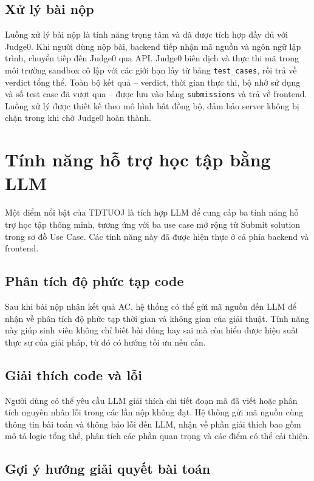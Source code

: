 \documentclass[12pt, a4paper]{report}
\begin{document}
\subsection{Xử lý bài nộp}

Luồng xử lý bài nộp là tính năng trọng tâm và đã được tích hợp đầy đủ với Judge0. Khi người dùng nộp bài, backend tiếp nhận mã nguồn và ngôn ngữ lập trình, chuyển tiếp đến Judge0 qua \ac{API}. Judge0 biên dịch và thực thi mã trong môi trường sandbox cô lập với các giới hạn lấy từ bảng \texttt{test\_cases}, rồi trả về verdict tổng thể. Toàn bộ kết quả -- verdict, thời gian thực thi, bộ nhớ sử dụng và số test case đã vượt qua -- được lưu vào bảng \texttt{submissions} và trả về frontend. Luồng xử lý được thiết kế theo mô hình bất đồng bộ, đảm bảo server không bị chặn trong khi chờ Judge0 hoàn thành.

\section{Tính năng hỗ trợ học tập bằng LLM}

Một điểm nổi bật của TDTUOJ là tích hợp \ac{LLM} để cung cấp ba tính năng hỗ trợ học tập thông minh, tương ứng với ba use case mở rộng từ Submit solution trong sơ đồ Use Case. Các tính năng này đã được hiện thực ở cả phía backend và frontend.

\subsection{Phân tích độ phức tạp code}

Sau khi bài nộp nhận kết quả \ac{AC}, hệ thống có thể gửi mã nguồn đến \ac{LLM} để nhận về phân tích độ phức tạp thời gian và không gian của giải thuật. Tính năng này giúp sinh viên không chỉ biết bài đúng hay sai mà còn hiểu được hiệu suất thực sự của giải pháp, từ đó có hướng tối ưu nếu cần.

\subsection{Giải thích code và lỗi}

Người dùng có thể yêu cầu \ac{LLM} giải thích chi tiết đoạn mã đã viết hoặc phân tích nguyên nhân lỗi trong các lần nộp không đạt. Hệ thống gửi mã nguồn cùng thông tin bài toán và thông báo lỗi đến \ac{LLM}, nhận về phần giải thích bao gồm mô tả logic tổng thể, phân tích các phần quan trọng và các điểm có thể cải thiện.

\subsection{Gợi ý hướng giải quyết bài toán}
\end{document}
